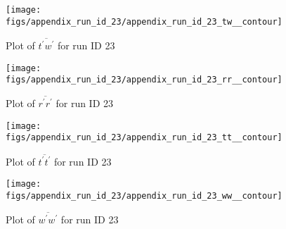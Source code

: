 \begin{figure}[H]
\centering
\texttt{[image: figs/appendix\_run\_id\_23/appendix\_run\_id\_23\_tw\_\_contour]}
\caption{Plot of $\overline{t^\prime w^\prime}$ for run ID 23}
\label{fig:appendix_run_id_23_tw__contour}
\end{figure}


\begin{figure}[H]
\centering
\texttt{[image: figs/appendix\_run\_id\_23/appendix\_run\_id\_23\_rr\_\_contour]}
\caption{Plot of $\overline{r^\prime r^\prime}$ for run ID 23}
\label{fig:appendix_run_id_23_rr__contour}
\end{figure}


\begin{figure}[H]
\centering
\texttt{[image: figs/appendix\_run\_id\_23/appendix\_run\_id\_23\_tt\_\_contour]}
\caption{Plot of $\overline{t^\prime t^\prime}$ for run ID 23}
\label{fig:appendix_run_id_23_tt__contour}
\end{figure}


\begin{figure}[H]
\centering
\texttt{[image: figs/appendix\_run\_id\_23/appendix\_run\_id\_23\_ww\_\_contour]}
\caption{Plot of $\overline{w^\prime w^\prime}$ for run ID 23}
\label{fig:appendix_run_id_23_ww__contour}
\end{figure}


